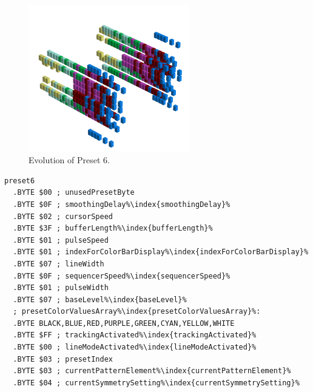 \vspace*{-0.7cm}
\begin{minipage}[b]{0.48\linewidth}


                                                                 
\begin{figure}[H]                                                          
  \centering                                                             
  \begin{adjustbox}{width=7cm,center}                                   
  \includegraphics[width=7cm]{src/presets/pattern6-45.png}%
  \end{adjustbox}                                                        
\caption{Evolution of Preset 6.}                                           
\end{figure}                                                               
                                                                 
                                                                           
\end{minipage}
\hspace{0.1cm}
\begin{minipage}[b]{0.48\linewidth}                                       
\begin{lstlisting}[basicstyle=\ttfamily\scriptsize,caption=Data structure for Preset 6.,escapechar=\%]
preset6
  .BYTE $00 ; unusedPresetByte
  .BYTE $0F ; smoothingDelay%\index{smoothingDelay}%
  .BYTE $02 ; cursorSpeed
  .BYTE $3F ; bufferLength%\index{bufferLength}%
  .BYTE $01 ; pulseSpeed
  .BYTE $01 ; indexForColorBarDisplay%\index{indexForColorBarDisplay}%
  .BYTE $07 ; lineWidth
  .BYTE $0F ; sequencerSpeed%\index{sequencerSpeed}%
  .BYTE $01 ; pulseWidth
  .BYTE $07 ; baseLevel%\index{baseLevel}%
  ; presetColorValuesArray%\index{presetColorValuesArray}%: 
  .BYTE BLACK,BLUE,RED,PURPLE,GREEN,CYAN,YELLOW,WHITE
  .BYTE $FF ; trackingActivated%\index{trackingActivated}%
  .BYTE $00 ; lineModeActivated%\index{lineModeActivated}%
  .BYTE $03 ; presetIndex
  .BYTE $03 ; currentPatternElement%\index{currentPatternElement}%
  .BYTE $04 ; currentSymmetrySetting%\index{currentSymmetrySetting}%
\end{lstlisting}
\end{minipage}

